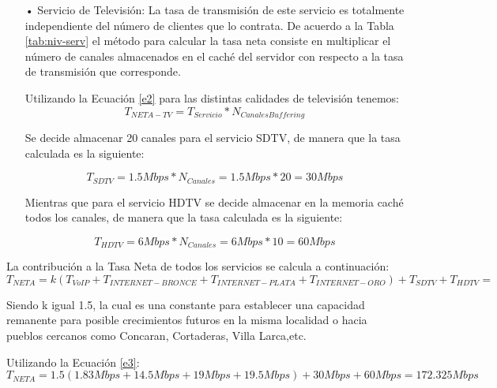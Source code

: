 \begin{itemize}
\item[•] Servicio de Televisión: La tasa de transmisión de este servicio es totalmente independiente del número de clientes que lo contrata. De acuerdo a la Tabla \ref{tab:niv-serv} el método para calcular la tasa neta consiste en multiplicar el número de canales almacenados en el caché del servidor con respecto a  la tasa de transmisión que corresponde.

Utilizando la Ecuación \ref{e2} para las distintas calidades de televisión tenemos:
\begin{equation}
T_{NETA-TV}=T_{Servicio}*N_{Canales Buffering}
\label{e2}
\end{equation}

Se decide almacenar 20 canales para el servicio SDTV, de manera que la tasa calculada es la siguiente:



\begin{equation}
T_{SDTV}=1.5Mbps*N_{Canales} =1.5Mbps * 20 =30Mbps
\end{equation}




Mientras que para el servicio HDTV se decide almacenar en la memoria caché todos los canales, de manera que la tasa calculada es la siguiente:





\begin{equation}
T_{HDTV}=6Mbps*N_{Canales}=6Mbps * 10 =60Mbps
\end{equation}

\end{itemize}

La contribución a la Tasa Neta de todos los servicios se calcula a continuación:
\begin{equation}
T_{NETA}=k(T_{VoIP}+T_{INTERNET-BRONCE}+T_{INTERNET-PLATA}+T_{INTERNET-ORO})+T_{SDTV}+T_{HDTV}=
\label{e3}
\end{equation}

Siendo k igual 1.5, la cual es una constante para establecer una capacidad remanente para posible crecimientos futuros en la misma localidad o hacia pueblos cercanos como Concaran, Cortaderas, Villa Larca,etc.


Utilizando la Ecuación \ref{e3}:
\begin{equation}
T_{NETA}=1.5(1.83 Mbps +  14.5Mbps + 19Mbps + 19.5Mbps)+30Mbps+60Mbps=172.325 Mbps
\end{equation}






